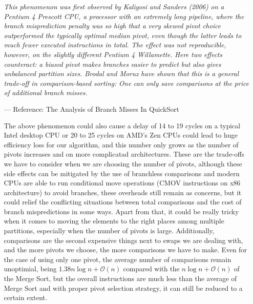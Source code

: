 \documentclass{article}
\newcommand{\bigO}{\mathcal{O}}
\begin{document}
\vspace{1em}
\hypertarget{ref:BranchMisses}{}
\textit{This phenomenon was first observed by Kaligosi and Sanders (2006) on a Pentium 4 Prescott CPU, a processor with an extremely long pipeline, where the branch misprediction penalty was so high that a very skewed pivot choice outperformed the typically optimal median pivot, even though the latter leads to much fewer executed instructions in total.
The effect was not reproducible, however, on the slightly different Pentium 4 Willamette. Here two effects counteract: a biased pivot makes branches easier to predict but also gives unbalanced partition sizes. Brodal and Moruz have shown that this is a general trade-off in comparison-based sorting: One can only save comparisons at the price of additional branch misses.}

--- Reference: The Analysis of Branch Misses In QuickSort \cite{AnalysisOfBranchMissesInQuickSort}
\vspace{1em}

The above phenomenon could also cause a delay of 14 to 19 cycles on a typical Intel desktop CPU or 20 to 25 cycles on AMD's Zen CPUs could lead to huge efficiency loss for our algorithm,
and this number only grows as the number of pivots increases and on more complicatad architectures. These are the trade-offs we have to consider when we are choosing the number of pivots,
although these side effects can be mitigated by the use of branchless comparisons and modern CPUs are able to run conditional move operations (CMOV instructions on x86 architecture) to avoid branches,
these overheads still remain as concerns, but it could relief the conflicting situations between total comparisons and the cost of branch mispredictions in some ways.
Apart from that, it could be really tricky when it comes to moving the elements to the right places among multiple partitions, especially when the number of pivots is large.
Additionally, comparisons are the second expensive things next to swaps we are dealing with, and the more pivots we choose, the more comparisons we have to make.
Even for the case of using only one pivot, the average number of comparisons remain unoptimial, being $1.38n\log n + \bigO(n)$ compared with the $n\log n + \bigO(n)$ of the Merge Sort,
but the overall instructions are much less than the average of Merge Sort and with proper pivot selection strategy, it can still be reduced to a certain extent.

\end{document}
